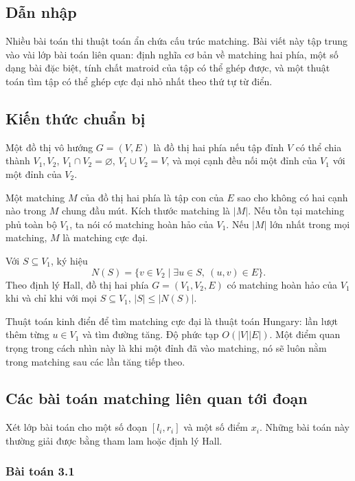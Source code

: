\documentclass[11pt]{article}
\begin{document}
\subsection{Dẫn nhập}

Nhiều bài toán thi thuật toán ẩn chứa cấu trúc matching. Bài viết này tập trung
vào vài lớp bài toán liên quan: định nghĩa cơ bản về matching hai phía, một số
dạng bài đặc biệt, tính chất matroid của tập có thể ghép được, và một thuật
toán tìm tập có thể ghép cực đại nhỏ nhất theo thứ tự từ điển.

\subsection{Kiến thức chuẩn bị}

Một đồ thị vô hướng \(G=(V,E)\) là đồ thị hai phía nếu tập đỉnh \(V\) có thể
chia thành \(V_1,V_2\), \(V_1\cap V_2=\varnothing\), \(V_1\cup V_2=V\), và mọi
cạnh đều nối một đỉnh của \(V_1\) với một đỉnh của \(V_2\).

Một matching \(M\) của đồ thị hai phía là tập con của \(E\) sao cho không có
hai cạnh nào trong \(M\) chung đầu mút. Kích thước matching là \(|M|\). Nếu tồn
tại matching phủ toàn bộ \(V_1\), ta nói có matching hoàn hảo của \(V_1\). Nếu
\(|M|\) lớn nhất trong mọi matching, \(M\) là matching cực đại.

Với \(S\subseteq V_1\), ký hiệu
\[
  N(S)=\{v\in V_2\mid \exists u\in S,\ (u,v)\in E\}.
\]
Theo định lý Hall, đồ thị hai phía \(G=(V_1,V_2,E)\) có matching hoàn hảo của
\(V_1\) khi và chỉ khi với mọi \(S\subseteq V_1\), \(|S|\le |N(S)|\).

Thuật toán kinh điển để tìm matching cực đại là thuật toán Hungary: lần lượt
thêm từng \(u\in V_1\) và tìm đường tăng. Độ phức tạp \(O(|V||E|)\). Một điểm
quan trọng trong cách nhìn này là khi một đỉnh đã vào matching, nó sẽ luôn nằm
trong matching sau các lần tăng tiếp theo.

\subsection{Các bài toán matching liên quan tới đoạn}

Xét lớp bài toán cho một số đoạn \([l_i,r_i]\) và một số điểm \(x_i\). Những
bài toán này thường giải được bằng tham lam hoặc định lý Hall.

\subsubsection{Bài toán 3.1}
\end{document}
